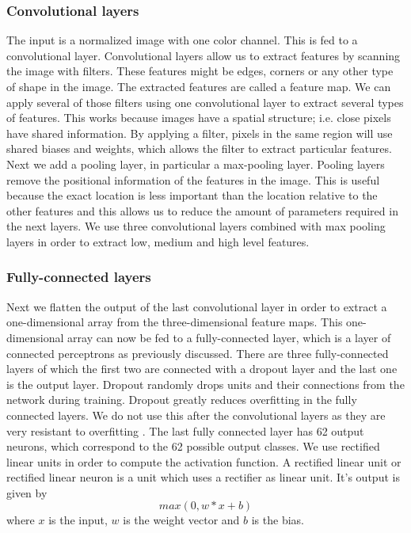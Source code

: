 \documentclass{article}
\begin{document}
\subsubsection{Convolutional layers}
 The input is a normalized image with one color channel. This is fed to a convolutional layer. Convolutional layers allow us to extract features by scanning the image with filters. These features might be edges, corners or any other type of shape in the image. The extracted features are called a feature map.
 We can apply several of those filters using one convolutional layer to extract several types of features.
 This works because images have a spatial structure; i.e. close pixels have shared information. By applying a filter, pixels in the same region will use shared biases and weights, which allows the filter to extract particular features.
 Next we add a pooling layer, in particular a max-pooling layer. Pooling layers remove the positional information of the features in the image. This is useful because the exact location is less important than the location relative to the other features and this allows us to reduce the amount of parameters required in the next layers.
We use three convolutional layers combined with max pooling layers in order to extract low, medium and high level features.
\subsubsection{Fully-connected layers}
Next we flatten the output of the last convolutional layer in order to extract a one-dimensional array from the three-dimensional feature maps. This one-dimensional array can now be fed to a fully-connected layer, which is a layer of connected perceptrons as previously discussed.
There are three fully-connected layers of which the first two are connected with a dropout layer and the last one is the output layer.
Dropout randomly drops units and their connections from the network during training. Dropout greatly reduces overfitting in the fully connected layers. \cite{dropout} We do not use this after the convolutional layers as they are very resistant to overfitting \cite{nnbook}.
The last fully connected layer has 62 output neurons, which correspond to the 62 possible output classes. We use rectified linear units in order to compute the activation function. A rectified linear unit or rectified linear neuron is a unit which uses a rectifier as linear unit. It's output is given by
\begin{equation}
        max(0, w*x+b)
\end{equation}
where $x$ is the input, $w$ is the weight vector and $b$ is the bias.
\end{document}
